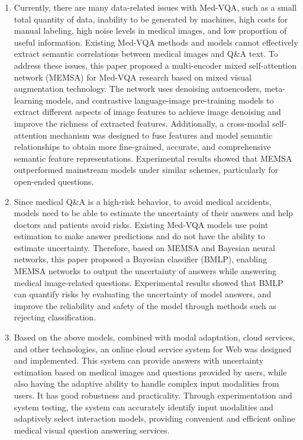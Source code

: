 \begin{enumerate}[topsep = 0 pt, itemsep= 0 pt, parsep=0pt, partopsep=0pt, leftmargin=0pt, itemindent=44pt, labelsep=6pt, label=(\arabic*)]
	\item Currently, there are many data-related issues with Med-VQA, such as a small total quantity of data, inability to be generated by machines, high costs for manual labeling, high noise levels in medical images, and low proportion of useful information. 
	Existing Med-VQA methods and models cannot effectively extract semantic correlations between medical images and Q\&A text. To address these issues, this paper proposed a multi-encoder mixed self-attention network (MEMSA) for Med-VQA research based on mixed visual augmentation technology. 
	The network uses denoising autoencoders, meta-learning models, and contrastive language-image pre-training models to extract different aspects of image features to achieve image denoising and improve the richness of extracted features. 
	Additionally, a cross-modal self-attention mechanism was designed to fuse features and model semantic relationships to obtain more fine-grained, accurate, and comprehensive semantic feature representations. Experimental results showed that MEMSA outperformed mainstream models under similar schemes, particularly for open-ended questions.
	\item Since medical Q\&A is a high-risk behavior, to avoid medical accidents, models need to be able to estimate the uncertainty of their answers and help doctors and patients avoid risks. Existing Med-VQA models use point estimation to make answer predictions and do not have the ability to estimate uncertainty. 
	Therefore, based on MEMSA and Bayesian neural networks, this paper proposed a Bayesian classifier (BMLP), enabling MEMSA networks to output the uncertainty of answers while answering medical image-related questions. Experimental results showed that BMLP can quantify risks by evaluating the uncertainty of model answers, and improve the reliability and safety of the model through methods such as rejecting classification.
	\item Based on the above models, combined with modal adaptation, cloud services, and other technologies, an online cloud service system for Web was designed and implemented. This system can provide answers with uncertainty estimation based on medical images and questions provided by users, while also having the adaptive ability to handle complex input modalities from users. 
	It has good robustness and practicality. Through experimentation and system testing, the system can accurately identify input modalities and adaptively select interaction models, providing convenient and efficient online medical visual question answering services.
\end{enumerate}


